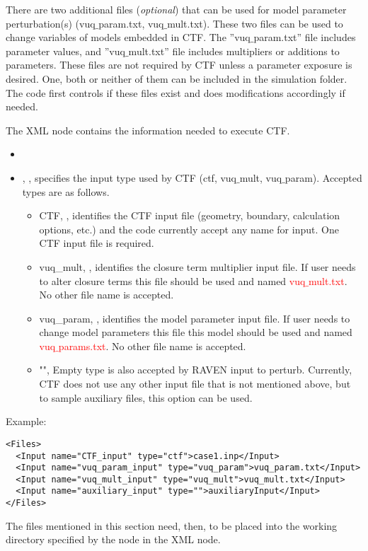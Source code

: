 \noindent There are two additional files (\textit{optional}) that can be used for model parameter perturbation(s) (vuq$\_$param.txt, vuq$\_$mult.txt). These two files can be used to change variables of models embedded in CTF. The ''vuq$\_$param.txt'' file includes parameter values, and ''vuq$\_$mult.txt'' file includes multipliers or additions to parameters. These files are not required by CTF unless a parameter exposure is desired. One, both or neither of them can be included in the simulation folder. The code first controls if these files exist and does modifications accordingly if needed.

The   XML node contains the information needed to execute CTF.

\attrsIntro
%
\vspace{-5mm}
\begin{itemize}
  \itemsep0em
  \item \nameDescription
  \item {}, , specifies the
  input type used by CTF (ctf, vuq$\_$mult, vuq$\_$param). Accepted types are as follows.
  \begin{itemize}
    \item CTF, , identifies the CTF input file (geometry, boundary, calculation options, etc.) and the code currently accept any name for input. One CTF input file is required.
    \item vuq\_mult, , identifies the closure term multiplier input file. If user needs to alter closure terms this file should be used and named \textcolor{red}{vuq$\_$mult.txt}. No other file name is accepted.
    \item vuq\_param, , identifies the model parameter input file. If user needs to change model parameters this file this model should be used and named \textcolor{red}{vuq$\_$params.txt}. No other file name is accepted.
    \item "", Empty type is also accepted by RAVEN input to perturb. Currently, CTF does not use any other input file that is not mentioned above, but to sample auxiliary files, this option can be used.
  \end{itemize}
\end{itemize}

\noindent Example:
\begin{lstlisting}[style=XML]
<Files>
  <Input name="CTF_input" type="ctf">case1.inp</Input>
  <Input name="vuq_param_input" type="vuq_param">vuq_param.txt</Input>
  <Input name="vuq_mult_input" type="vuq_mult">vuq_mult.txt</Input>
  <Input name="auxiliary_input" type="">auxiliaryInput</Input>
</Files>
\end{lstlisting}
The files mentioned in this section
 need, then, to be placed into the working directory specified
by the  node in the  XML node.

